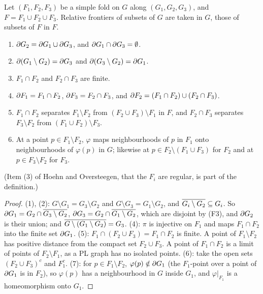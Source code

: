 \begin{lemma}\label{lem:ho6}
Let $(F_1,F_2,F_3)$ be a simple fold on $G$ along $(G_1,G_2,G_3)$, and $F=F_1\cup F_2\cup F_3$. Relative frontiers of subsets of $G$ are taken in $G$, those of subsets
of $F$ in $F$.
\begin{enumerate}[label=(\arabic*)]
\item $\partial G_2=\partial G_1\cup\partial G_3$, and $\partial G_1\cap\partial G_3=\emptyset$.
\item $\partial(G_1\setminus G_2)=\partial G_3$ and $\partial(G_3\setminus G_2)=\partial G_1$.
\item[(4)] $F_1\cap F_2$ and $F_2\cap F_3$ are finite.
\item[(5)] $\partial F_1=F_1\cap F_2$, $\partial F_3=F_2\cap F_3$, and $\partial F_2=(F_1\cap F_2)\cup(F_2\cap F_3)$.
\item[(6)] $F_1\cap F_2$ separates $F_1\setminus F_2$ from $(F_2\cup F_3)\setminus F_1$ in $F$, and $F_2\cap F_3$ separates $F_3\setminus F_2$ from $(F_1\cup F_2)\setminus F_3$.
\item[(7)] At a point $p\in F_1\setminus F_2$, $\varphi$ maps neighbourhoods of $p$ in $F_1$ onto neighbourhoods of $\varphi(p)$ in $G$; likewise at $p\in F_2\setminus(F_1\cup F_3)$
for $F_2$ and at $p\in F_3\setminus F_2$ for $F_3$.
\end{enumerate}
\end{lemma}

(Item (3) of Hoehn and Oversteegen, that the $F_i$ are regular, is part of the definition.)

\begin{proof}
(1), (2): $G\setminus G_1=G_3\setminus G_2$ and $G\setminus G_3=G_1\setminus G_2$, and $\overline{G_i\setminus G_2}\subseteq G_i$. So $\partial G_1=G_2\cap\overline{G_3\setminus G_2}$,
$\partial G_3=G_2\cap\overline{G_1\setminus G_2}$, which are disjoint by (F3), and $\partial G_2$ is their union; and $\overline{G\setminus(G_1\setminus G_2)}=G_3$.
(4): $\pi$ is injective on $F_1$ and maps $F_1\cap F_2$ into the finite set $\partial G_1$.
(5): $F_1\cap(F_2\cup F_3)=F_1\cap F_2$ is finite. A point of $F_1\setminus F_2$ has positive distance from the compact set $F_2\cup F_3$. A point of $F_1\cap F_2$ is a limit of
points of $F_2\setminus F_1$, as a PL graph has no isolated points.
(6): take the open sets $(F_2\cup F_3)^c$ and $F_1^c$.
(7): for $p\in F_1\setminus F_2$, $\varphi(p)\notin\partial G_1$ (the $F_1$-point over a point of $\partial G_1$ is in $F_2$), so $\varphi(p)$ has a neighbourhood in $G$ inside $G_1$,
and $\varphi|_{F_1}$ is a homeomorphism onto $G_1$.
\end{proof}

